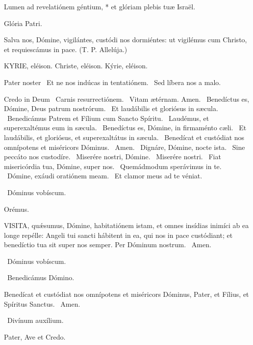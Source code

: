 Lumen ad revelatiónem géntium, * et glóriam plebis tuæ Israël.

Glória Patri.

 Salva nos, Dómine, vigilántes, custódi nos dormiéntes: ut vigilémus cum Christo, et requiescámus in pace. (T. P. Allelúja.)


KYRIE, eléison. Christe, eléison. Kýrie, eléison.

Pater noster  \V\ Et ne nos indúcas in tentatiónem. \R\ Sed líbera nos a malo.

Credo in Deum  \V\ Carnis resurrectiónem. \R\ Vitam ætérnam. Amen. \V\ Benedíctus es, Dómine, Deus patrum nostrórum. \R\ Et laudábilis et gloriósus in sæcula. \V\ Benedicámus Patrem et Fílium cum Sancto Spíritu. \R\ Laudémus, et superexaltémus eum in sæcula. \V\ Benedíctus es, Dómine, in firmaménto cæli. \R\ Et laudábilis, et gloriósus, et superexaltátus in sæcula. \V\ Benedícat et custódiat nos omnípotens et miséricors Dóminus. \R\ Amen. \V\ Dignáre, Dómine, nocte ista. \R\ Sine peccáto nos custodíre. \V\ Miserére nostri, Dómine. \R\ Miserére nostri. \V\ Fiat misericórdia tua, Dómine, super nos. \R\ Quemádmodum sperávimus in te. \V\ Dómine, exáudi oratiónem meam. \R\ Et clamor meus ad te véniat.

\V\ Dóminus vobíscum.

Orémus. 

\lettrine[lines=2]{V}{ISITA}, quǽsumus, Dómine, habitatiónem istam, et omnes insídias inimíci ab ea longe repélle: Angeli tui sancti hábitent in ea, qui nos in pace custódiant; et benedíctio tua sit super nos semper. Per Dóminum nostrum. \R\ Amen.

\V\ Dóminus vobíscum.

\V\ Benedicámus Dómino.

 Benedícat et custódiat nos omnípotens et miséricors Dóminus, Pater, et Fílius, et Spíritus Sanctus. \R\ Amen.


\V\ Divínum auxílium.

Pater, Ave et Credo.

\sectionornament


